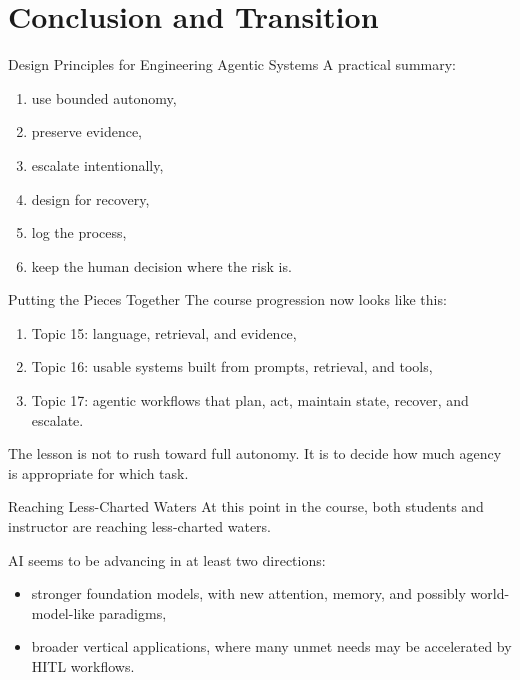 \documentclass[12pt]{beamer}
\begin{document}
\section{Conclusion and Transition}

\begin{frame}{Design Principles for Engineering Agentic Systems}
  A practical summary:
  \begin{enumerate}
    \item use bounded autonomy,
    \item preserve evidence,
    \item escalate intentionally,
    \item design for recovery,
    \item log the process,
    \item keep the human decision where the risk is.
  \end{enumerate}
\end{frame}

\begin{frame}{Putting the Pieces Together}
  The course progression now looks like this:
  \begin{enumerate}
    \item Topic 15: language, retrieval, and evidence,
    \item Topic 16: usable systems built from prompts, retrieval, and tools,
    \item Topic 17: agentic workflows that plan, act, maintain state, recover, and escalate.
  \end{enumerate}

  The lesson is not to rush toward full autonomy. It is to decide how much agency is appropriate for which task.
\end{frame}

\begin{frame}{Reaching Less-Charted Waters}
  At this point in the course, both students and instructor are reaching less-charted waters.

  AI seems to be advancing in at least two directions:
  \begin{itemize}
    \item stronger foundation models, with new attention, memory, and possibly world-model-like paradigms,
    \item broader vertical applications, where many unmet needs may be accelerated by HITL workflows.
  \end{itemize}
\end{frame}
\end{document}
